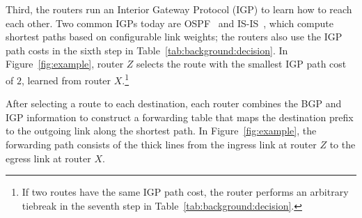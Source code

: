 Third, the routers run an Interior Gateway Protocol (IGP) to learn how
to reach each other.  Two common IGPs today are OSPF~\cite{rfc1583} and
IS-IS~\cite{rfc1142}, which compute shortest paths based on configurable
link weights; the routers also use the IGP path costs in the sixth step
in Table~\ref{tab:background:decision}.  In Figure~\ref{fig:example},
router $Z$ selects the route with the smallest IGP path cost of $2$,
learned from router $X$.\footnote{If two routes have the same IGP path
cost, the router performs an arbitrary tiebreak in the seventh step in
Table~\ref{tab:background:decision}.}

After selecting a route to each destination, each router combines the
BGP and IGP information to construct a forwarding table that maps the
destination prefix to the outgoing link along the shortest path.  In
Figure~\ref{fig:example}, the forwarding path consists of the thick
lines from the ingress link at router $Z$ to the egress link at router
$X$.

